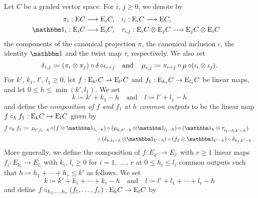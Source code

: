 \documentclass[\MainFolder/Text.tex]{subfiles}
\begin{document}
\begin{Definition} \label{Def:CircS}
Let $C$ be a graded vector space. For $i$, $j\ge 0$, we denote by 
$$ \begin{aligned} \pi_i : \Ext C \longrightarrow \Ext_i C,& \quad \iota_i : \Ext_i C \longrightarrow \Ext C, \\
 \Id_i : \Ext_i C \longrightarrow \Ext_i C,& \quad \begin{aligned}[t]\tau_{i,j}: \Ext_i C\otimes \Ext_j C &\longrightarrow \Ext_j C \otimes \Ext_i C \end{aligned}
 \end{aligned} $$ 
the components of the canonical projection $\pi$, the canonical inclusion $\iota$, the identity $\Id$ and the twist map $\tau$, respectively. We also set 
$$ \operatorname{\delta}_{i,j} \coloneqq (\pi_i \otimes \pi_j)\circ \operatorname{\delta}\circ \iota_{i+j} \quad\text{and}\quad \operatorname{\mu}_{i,j}\coloneqq \pi_{i+j}\circ \operatorname{\mu}\circ (\iota_i \otimes \iota_j). $$
For $k'$, $k_1$, $l'$, $l_1\ge 0$, let $f: \mathrm{E}_{k'}C \rightarrow \mathrm{E}_{l'} C$ and $f_1: \mathrm{E}_{k_1} C \rightarrow \mathrm{E}_{l_1} C$ be linear maps, and let $0 \le h \le \min(k', l_1)$. We set  
$$k \coloneqq k' + k_1 - h \quad\text{and}\quad l \coloneqq l' + l_1 - h $$
and define the \emph{composition of $f$ and $f_1$ at $h$ common outputs} to be the linear map $f \circ_h f_1: \mathrm{E}_k C \rightarrow \mathrm{E}_l C$ given by 
\begin{equation}\label{Eq:CompositionSimple}
f \circ_h f_1 \coloneqq \begin{multlined}[t]\Prod_{l', l_1 - h} \circ (f\otimes \Id_{l_1-h})\circ (\Prod_{h, k'-h}\otimes \Id_{l_1-h})\circ (\Id_{h} \otimes \tau_{\rule{0pt}{7pt}l_1-h,k'-h}) \\[\jot] \circ (\CoProd_{h,l_1-h}\otimes \Id_{k'-h}) \circ (f_1 \otimes \Id_{k'-h} ) \circ \CoProd_{k_1, k'-h}. \end{multlined}
\end{equation}
More generally, we define the composition of $f: E_{k'}\rightarrow E_{l'}$ with $r\ge 1$ linear maps $f_{i}: E_{k_i} \rightarrow E_{l_i}$ with $k_i$, $l_i \ge 0$ for $i=1$,~$\dotsc$, $r$ at $0 \le h_i \le l_i$ common outputs such that $h\coloneqq h_1 + \dotsb + h_r \le k'$ as follows. We set 
$$ k\coloneqq k' + k_1 + \dotsb + k_r-h\quad\text{and}\quad l\coloneqq l' +  l_1 + \dotsb + l_r  - h $$
and define $f\circ_{h_1, \dotsc, h_r}(f_1, \dotsc, f_r): \mathrm{E}_k C \rightarrow \mathrm{E}_l C$ by

\end{Definition}
\end{document}
